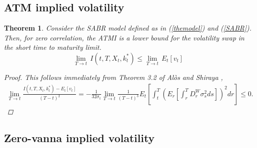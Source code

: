 \documentclass[11pt]{article}
\newtheorem{theorem}{Theorem}
\begin{document}
\subsection{ATM implied volatility}
\begin{theorem} Consider the SABR model defined as in (\ref{themodel}) and (\ref{SABR}). Then, for zero correlation, the ATMI is a lower bound for the volatility swap in the short time to maturity limit.
\begin{equation}
\lim_{T \to t} \, I( t,T,X_t,k^*_t) \leq \lim_{T \to t} \,  E_{t}[v_{t}]
\end{equation}
\begin{proof}
This follows immediately from Theorem 3.2 of Al\`os and Shiraya \cite{AS},
\begin{eqnarray}
\lim_{T\rightarrow t}\frac{I\left( t,T,X_t,k^*_t\right) -E_{t}\left[v_{t}\right] }{(T-t)^{2}}
= -\frac{1}{32\sigma _{t}}\lim_{T\rightarrow t}
\frac{1}{(T-t)^{3}}E_{t}\left[\int_{t}^{T}\left(E_{r}\left[\int_{r}^{T}D_{r}^{W}\sigma_{s}^{2}ds\right]\right) ^{2}dr\right] \le 0.
\end{eqnarray}
\end{proof}
\end{theorem}


\subsection{Zero-vanna implied volatility}
\end{document}
